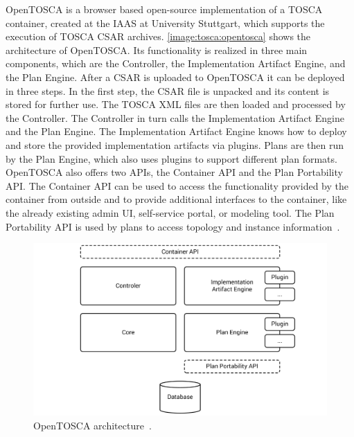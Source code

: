 OpenTOSCA is a browser based open-source implementation of a TOSCA container, created at the IAAS at University Stuttgart, which supports the execution of TOSCA CSAR archives.
\autoref{image:tosca:opentosca} shows the architecture of OpenTOSCA.
Its functionality is realized in three main components, which are the Controller, the Implementation Artifact Engine, and the Plan Engine.
After a CSAR is uploaded to OpenTOSCA it can be deployed in three steps.
In the first step, the CSAR file is unpacked and its content is stored for further use.
The TOSCA XML files are then loaded and processed by the Controller.
The Controller in turn calls the Implementation Artifact Engine and the Plan Engine.
The Implementation Artifact Engine knows how to deploy and store the provided implementation artifacts via plugins.
Plans are then run by the Plan Engine, which also uses plugins to support different plan formats.
OpenTOSCA also offers two APIs, the Container API and the Plan Portability API.
The Container API can be used to access the functionality provided by the container from outside and to provide additional interfaces to the container, like the already existing admin UI, self-service portal, or modeling tool.
The Plan Portability API is used by plans to access topology and instance information~\autocite{opentosca}.

\begin{figure}[!htbp]
	\centering
	\includegraphics[resolution=600]{fundamentals/assets/opentosca}
	\caption{OpenTOSCA architecture~\autocite[based on][]{opentosca}.}
	\label{image:tosca:opentosca}
\end{figure}
